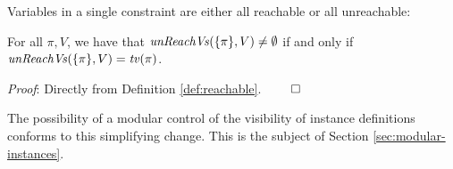 Variables in a single constraint are either all reachable or all
unreachable:

\begin{Lemma}
  \label{lemma:unreachable-means-all-unreachable}
  For all $\pi, V$, we have that $\text{\it unReachVs\/}(\{\pi\},V)\not=\emptyset$
  if and only if $\text{\it unReachVs\/}(\{\pi\},V)={\it tv\/}(\pi)$.
\end{Lemma}

{\em Proof\/}: Directly from Definition \ref{def:reachable}. $\qed$

The possibility of a modular control of the visibility of instance
definitions conforms to this simplifying change. This is the subject
of Section \ref{sec:modular-instances}. 
